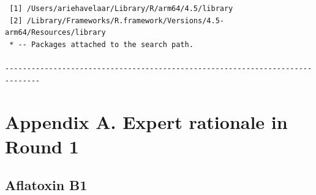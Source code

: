 \documentclass[
  letterpaper,
  DIV=11,
  numbers=noendperiod]{scrartcl}
\begin{document}
\begin{verbatim}
 [1] /Users/ariehavelaar/Library/R/arm64/4.5/library
 [2] /Library/Frameworks/R.framework/Versions/4.5-arm64/Resources/library
 * -- Packages attached to the search path.

------------------------------------------------------------------------------
\end{verbatim}

\newpage{}

\section*{Appendix A. Expert rationale in Round
1}\label{appendix-a.-expert-rationale-in-round-1}

\subsection*{Aflatoxin B1}\label{aflatoxin-b1}
\end{document}
